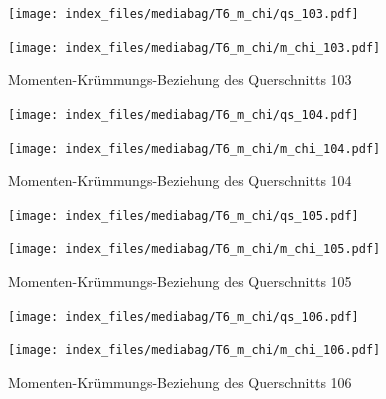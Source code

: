 \documentclass[
  11pt,
  letterpaper,
]{scrreprt}
\begin{document}
\begin{figure}[H]

\begin{minipage}{0.50\linewidth}
\texttt{[image: index\_files/mediabag/T6\_m\_chi/qs\_103.pdf]}\end{minipage}%
%
\begin{minipage}{0.50\linewidth}
\texttt{[image: index\_files/mediabag/T6\_m\_chi/m\_chi\_103.pdf]}\end{minipage}%

\caption{\label{fig-m_chi_appendix}Momenten-Krümmungs-Beziehung des
Querschnitts 103}

\end{figure}%

\begin{figure}[H]

\begin{minipage}{0.50\linewidth}
\texttt{[image: index\_files/mediabag/T6\_m\_chi/qs\_104.pdf]}\end{minipage}%
%
\begin{minipage}{0.50\linewidth}
\texttt{[image: index\_files/mediabag/T6\_m\_chi/m\_chi\_104.pdf]}\end{minipage}%

\caption{\label{fig-m_chi_appendix}Momenten-Krümmungs-Beziehung des
Querschnitts 104}

\end{figure}%

\begin{figure}[H]

\begin{minipage}{0.50\linewidth}
\texttt{[image: index\_files/mediabag/T6\_m\_chi/qs\_105.pdf]}\end{minipage}%
%
\begin{minipage}{0.50\linewidth}
\texttt{[image: index\_files/mediabag/T6\_m\_chi/m\_chi\_105.pdf]}\end{minipage}%

\caption{\label{fig-m_chi_appendix}Momenten-Krümmungs-Beziehung des
Querschnitts 105}

\end{figure}%

\begin{figure}[H]

\begin{minipage}{0.50\linewidth}
\texttt{[image: index\_files/mediabag/T6\_m\_chi/qs\_106.pdf]}\end{minipage}%
%
\begin{minipage}{0.50\linewidth}
\texttt{[image: index\_files/mediabag/T6\_m\_chi/m\_chi\_106.pdf]}\end{minipage}%

\caption{\label{fig-m_chi_appendix}Momenten-Krümmungs-Beziehung des
Querschnitts 106}

\end{figure}%
\end{document}
